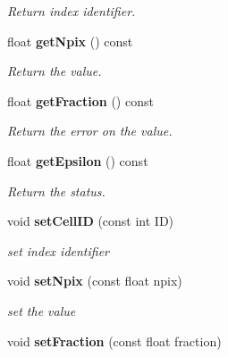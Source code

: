 \begin{DoxyCompactItemize}
\begin{DoxyCompactList}\small\item\em Return index identifier. \item\end{DoxyCompactList}\item 
float {\bf getNpix} () const \label{classCALICE_1_1SaturationParameters_a6c0537cf991175491fd93d925bbc5f39}

\begin{DoxyCompactList}\small\item\em Return the value. \item\end{DoxyCompactList}\item 
float {\bf getFraction} () const \label{classCALICE_1_1SaturationParameters_a6a8d38ce8423fd0d339fb23199f7b39b}

\begin{DoxyCompactList}\small\item\em Return the error on the value. \item\end{DoxyCompactList}\item 
float {\bf getEpsilon} () const \label{classCALICE_1_1SaturationParameters_a8ae9b72141c04d4737efecaed397561f}

\begin{DoxyCompactList}\small\item\em Return the status. \item\end{DoxyCompactList}\item 
void {\bf setCellID} (const int ID)\label{classCALICE_1_1SaturationParameters_a18580ee23f36d2ab14f070aab1eb3b87}

\begin{DoxyCompactList}\small\item\em set index identifier \item\end{DoxyCompactList}\item 
void {\bf setNpix} (const float npix)\label{classCALICE_1_1SaturationParameters_a2a05f0a0d82bc61e6143b02d4f7413ea}

\begin{DoxyCompactList}\small\item\em set the value \item\end{DoxyCompactList}\item 
void {\bf setFraction} (const float fraction)\label{classCALICE_1_1SaturationParameters_a7959da20d57e2d14422b6543854706c0}


\end{DoxyCompactItemize}
